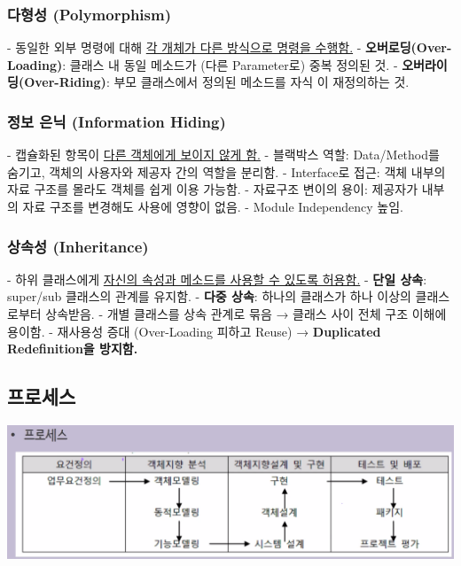 \documentclass[a4paper,12pt]{article}
\begin{document}
\subsubsection{다형성 (Polymorphism)}
- 동일한 외부 명령에 대해 \underline{각 개체가 다른 방식으로 명령을 수행함.}
\newline
- \textbf{오버로딩(Over-Loading)}: 클래스 내 동일 메소드가 (다른 Parameter로) 중복 정의된 것.
\newline
- \textbf{오버라이딩(Over-Riding)}: 부모 클래스에서 정의된 메소드를 자식 이 재정의하는 것.

\subsubsection{정보 은닉 (Information Hiding)}
- 캡슐화된 항목이 \underline{다른 객체에게 보이지 않게 함.}
\newline
- 블랙박스 역할: Data/Method를 숨기고, 객체의 사용자와 제공자 간의 역할을 분리함.
\newline
- Interface로 접근: 객체 내부의 자료 구조를 몰라도 객체를 쉽게 이용 가능함.
\newline
- 자료구조 변이의 용이: 제공자가 내부의 자료 구조를 변경해도 사용에 영향이 없음.
\newline
- Module Independency 높임.

\subsubsection{상속성 (Inheritance)}
- 하위 클래스에게 \underline{자신의 속성과 메소드를 사용할 수 있도록 허용함.}
\newline
- \textbf{단일 상속}: super/sub 클래스의 관계를 유지함.
\newline
- \textbf{다중 상속}: 하나의 클래스가 하나 이상의 클래스로부터 상속받음.
\newline
- 개별 클래스를 상속 관계로 묶음 → 클래스 사이 전체 구조 이해에 용이함.
\newline
- 재사용성 증대 (Over-Loading 피하고 Reuse) → \textbf{Duplicated Redefinition을 방지함.}
\newline

\subsection{프로세스}

\includegraphics[scale=0.4]{56}
\newline
\end{document}
